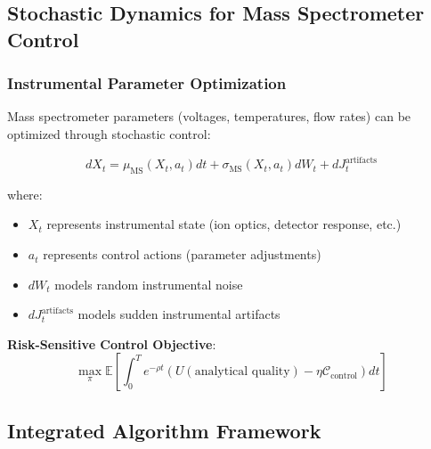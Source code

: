 \documentclass[11pt,a4paper]{article}
\theoremstyle{remark}
\begin{document}
\subsection{Stochastic Dynamics for Mass Spectrometer Control}

\subsubsection{Instrumental Parameter Optimization}

Mass spectrometer parameters (voltages, temperatures, flow rates) can be optimized through stochastic control:

\begin{equation}
dX_t = \mu_{\text{MS}}(X_t, a_t) dt + \sigma_{\text{MS}}(X_t, a_t) dW_t + dJ_t^{\text{artifacts}}
\end{equation}

where:
\begin{itemize}
\item $X_t$ represents instrumental state (ion optics, detector response, etc.)
\item $a_t$ represents control actions (parameter adjustments)
\item $dW_t$ models random instrumental noise
\item $dJ_t^{\text{artifacts}}$ models sudden instrumental artifacts
\end{itemize}

\textbf{Risk-Sensitive Control Objective}:
\begin{equation}
\max_{\pi} \mathbb{E}\left[\int_0^T e^{-\rho t}(U(\text{analytical quality}) - \eta \mathcal{C}_{\text{control}}) dt\right]
\end{equation}

\subsection{Integrated Algorithm Framework}
\end{document}
